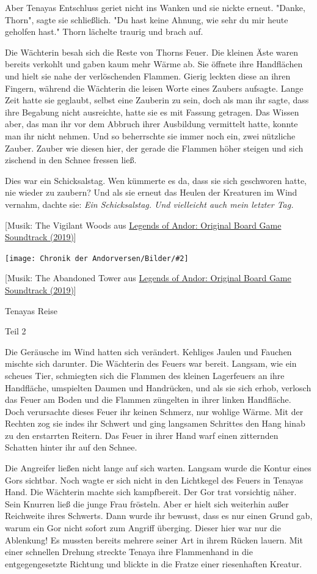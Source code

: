 \documentclass[10pt, a4paper, oneside]{book}
\newcommand{\refprodukt}[1]{\hyperref[Produkt: #1]{#1}}
\newcommand{\bildmitts}[2][height=0.32\textwidth,width=0.48\textwidth,keepaspectratio]{%
    \begin{center}
        \texttt{[image: Chronik der Andorversen/Bilder/\#2]}
    \end{center}
}
\begin{document}
\begin{multicols}{2}
Aber Tenayas Entschluss geriet nicht ins Wanken und sie nickte erneut. "Danke, Thorn", sagte sie schließlich. "Du hast keine Ahnung, wie sehr du mir heute geholfen hast." Thorn lächelte traurig und brach auf. 

Die Wächterin besah sich die Reste von Thorns Feuer. Die kleinen Äste waren bereits verkohlt und gaben kaum mehr Wärme ab. Sie öffnete ihre Handflächen und hielt sie nahe der verlöschenden Flammen. Gierig leckten diese an ihren Fingern, während die Wächterin die leisen Worte eines Zaubers aufsagte. Lange Zeit hatte sie geglaubt, selbst eine Zauberin zu sein, doch als man ihr sagte, dass ihre Begabung nicht ausreichte, hatte sie es mit Fassung getragen. Das Wissen aber, das man ihr vor dem Abbruch ihrer Ausbildung vermittelt hatte, konnte man ihr nicht nehmen. Und so beherrschte sie immer noch ein, zwei nützliche Zauber. Zauber wie diesen hier, der gerade die Flammen höher steigen und sich zischend in den Schnee fressen ließ. 

Dies war ein Schicksalstag. Wen kümmerte es da, dass sie sich geschworen hatte, nie wieder zu zaubern? Und als sie erneut das Heulen der Kreaturen im Wind vernahm, dachte sie: \textit{Ein Schicksalstag. Und vielleicht auch mein letzter Tag.}\bigskip

[Musik: The Vigilant Woods aus \refprodukt{Legends of Andor: Original Board Game Soundtrack (2019)}]

\bildmitts{Tenayas Reise Teil 2 Cover.jpeg}

[Musik: The Abandoned Tower aus \refprodukt{Legends of Andor: Original Board Game Soundtrack (2019)}]\bigskip

Tenayas Reise

Teil 2\bigskip

Die Geräusche im Wind hatten sich verändert. Kehliges Jaulen und Fauchen mischte sich darunter. Die Wächterin des Feuers war bereit. Langsam, wie ein scheues Tier, schmiegten sich die Flammen des kleinen Lagerfeuers an ihre Handfläche, umspielten Daumen und Handrücken, und als sie sich erhob, verlosch das Feuer am Boden und die Flammen züngelten in ihrer linken Handfläche. Doch verursachte dieses Feuer ihr keinen Schmerz, nur wohlige Wärme. Mit der Rechten zog sie indes ihr Schwert und ging langsamen Schrittes den Hang hinab zu den erstarrten Reitern. Das Feuer in ihrer Hand warf einen zitternden Schatten hinter ihr auf den Schnee. 

Die Angreifer ließen nicht lange auf sich warten. Langsam wurde die Kontur eines Gors sichtbar. Noch wagte er sich nicht in den Lichtkegel des Feuers in Tenayas Hand. Die Wächterin machte sich kampfbereit. Der Gor trat vorsichtig näher. Sein Knurren ließ die junge Frau frösteln. Aber er hielt sich weiterhin außer Reichweite ihres Schwerts. Dann wurde ihr bewusst, dass es nur einen Grund gab, warum ein Gor nicht sofort zum Angriff überging. Dieser hier war nur die Ablenkung! Es mussten bereits mehrere seiner Art in ihrem Rücken lauern. Mit einer schnellen Drehung streckte Tenaya ihre Flammenhand in die entgegengesetzte Richtung und blickte in die Fratze einer riesenhaften Kreatur.


\end{multicols}
\end{document}
